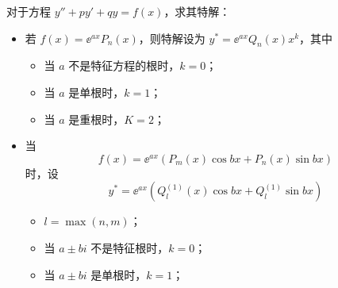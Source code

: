 对于方程 $y'' + py' + qy = f(x)$，求其特解：

\begin{itemize}
	\item 若 $f(x) = \ee^{a x} P_n(x)$，则特解设为 $y^* = \ee^{ax} Q_n(x) x^k$，其中
	\begin{itemize}
		\item 当 $a$ 不是特征方程的根时，$k = 0$；
		\item 当 $a$ 是单根时，$k = 1$；
		\item 当 $a$ 是重根时，$K = 2$；
	\end{itemize}
	\item 当
	\[ f(x) = \ee^{ax}\left( P_m(x) \cos b x + P_n(x) \sin b x \right) \]
	时，设
	\[ y^* = \ee^{ax}\left( Q_l^{(1)}(x) \cos b x + Q_l^{(1)} \sin b x \right) \]
	\begin{itemize}
		\item $l = \max(n, m)$；
		\item 当 $a \pm b i$ 不是特征根时，$k = 0$；
		\item 当 $a \pm b i$ 是单根时，$k = 1$；
	\end{itemize}
\end{itemize}
